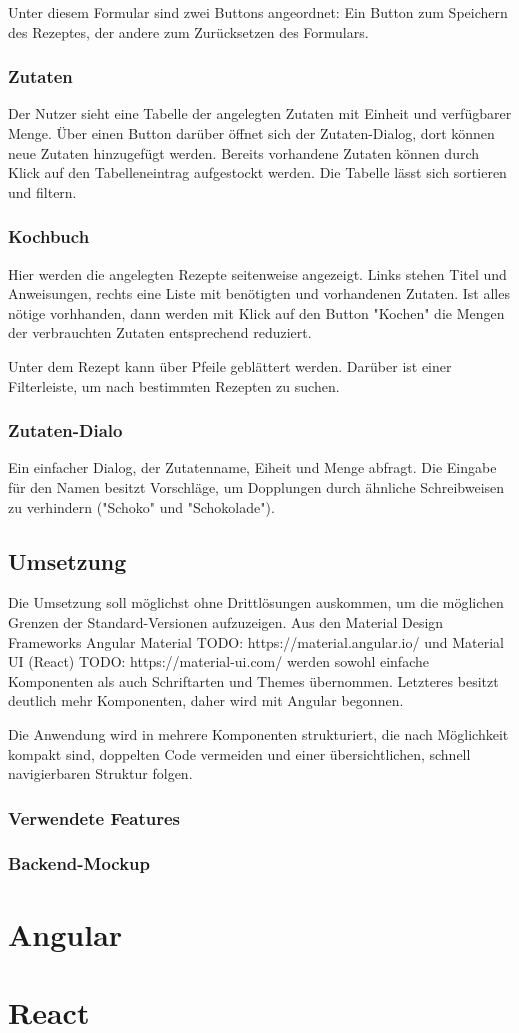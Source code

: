 Unter diesem Formular sind zwei Buttons angeordnet: Ein Button zum Speichern des Rezeptes, der andere zum Zurücksetzen des Formulars.

\subsubsection{Zutaten}

Der Nutzer sieht eine Tabelle der angelegten Zutaten mit Einheit und verfügbarer Menge. Über einen Button darüber öffnet sich der Zutaten-Dialog, dort können neue Zutaten hinzugefügt werden. Bereits vorhandene Zutaten können durch Klick auf den Tabelleneintrag aufgestockt werden. Die Tabelle lässt sich sortieren und filtern. 

\subsubsection{Kochbuch}

Hier werden die angelegten Rezepte seitenweise angezeigt. Links stehen Titel und Anweisungen, rechts eine Liste mit benötigten und vorhandenen Zutaten. Ist alles nötige vorhhanden, dann werden mit Klick auf den Button "Kochen" die Mengen der verbrauchten Zutaten entsprechend reduziert.

Unter dem Rezept kann über Pfeile geblättert werden. Darüber ist einer Filterleiste, um nach bestimmten Rezepten zu suchen.

\subsubsection{Zutaten-Dialo}

Ein einfacher Dialog, der Zutatenname, Eiheit und Menge abfragt. Die Eingabe für den Namen besitzt Vorschläge, um Dopplungen durch ähnliche Schreibweisen zu verhindern ("Schoko" und "Schokolade").

\subsection{Umsetzung}

Die Umsetzung soll möglichst ohne Drittlösungen auskommen, um die möglichen Grenzen der Standard-Versionen aufzuzeigen. Aus den Material Design Frameworks Angular Material TODO: https://material.angular.io/ und Material UI (React) TODO: https://material-ui.com/ werden sowohl einfache Komponenten als auch Schriftarten und Themes übernommen. Letzteres besitzt deutlich mehr Komponenten, daher wird mit Angular begonnen.

Die Anwendung wird in mehrere Komponenten strukturiert, die nach Möglichkeit kompakt sind, doppelten Code vermeiden und einer übersichtlichen, schnell navigierbaren Struktur folgen.

\subsubsection{Verwendete Features}
\subsubsection{Backend-Mockup}

\section{Angular}
\section{React}
